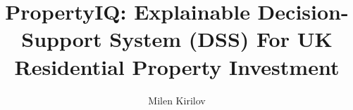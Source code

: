\documentclass{template}
\begin{document}

\title{\huge{PropertyIQ: Explainable Decision-Support System (DSS) For UK Residential Property Investment}}
\author{Milen Kirilov}










\footnotesize %

\printbibliography
\normalsize

\appendix

\end{document}
